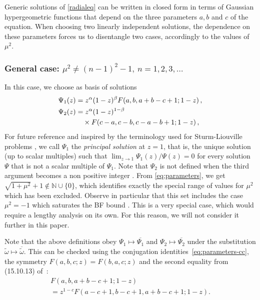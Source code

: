 \documentclass[aps, prd, amsmath, floats, floatfix, twocolumn, nofootinbib, superscriptaddress, showpacs]{revtex4-1}
\def\tomega{{\tilde{\omega}}}
\begin{document}
	Generic solutions of \eqref{radialeq} can be written in closed form in terms of Gaussian hypergeometric functions that depend on the three parameters $a,b$ and $c$ of the equation. When choosing two linearly independent solutions, the dependence on these parameters forces us to disentangle two cases, accordingly to the values of $\mu^2$. 
	
	
	\subsubsection{General case: $\mu^2\neq (n-1)^2-1, \ n=1,2,3,\dots$}	
	
	In this case, we choose as basis of solutions 
	\begin{subequations}\label{eq:z1gen}
	\begin{align}
	\Psi_1(z) & =z^\alpha(1-z)^\beta F(a,b,a+b-c+1;1-z) \label{Psi1a}  \, , \\
	\Psi_2(z) & =z^\alpha(1-z)^{1-\beta}\notag \\
	&\quad \times F(c-a,c-b,c-a-b+1;1-z) \label{Psi2a} \, ,
	\end{align}
	\end{subequations}
	For future reference and inspired by the terminology used for Sturm-Liouville problems \cite{Zettl:2005}, we call $\Psi_1$  the \emph{principal solution} at $z=1$, that is, the unique solution (up to scalar multiples) such that $\lim_{z\to 1} \Psi_1(z)/\Psi(z)=0$ for every solution $\Psi$ that is not a scalar multiple of $\Psi_1$. Note that $\Psi_2$ is not defined when the third argument becomes a non positive integer \cite{NIST}. From \eqref{eq:parameters}, we get $\sqrt{1+\mu^2}+1\not\in\mathbb{N}\cup\{0\}$, which identifies exactly the special range of values for $\mu^2$ which has been excluded. Observe in particular that this set includes the case $\mu^2=-1$ which saturates the BF bound \cite{Breitenlohner:1982jf}. This is a very special case, which would require a lengthy analysis on its own. For this reason, we will not consider it further in this paper.	

	Note that the above definitions obey $\Psi_1 \mapsto
	\overline{\Psi_1}$ and $\Psi_2 \mapsto \overline{\Psi_2}$ under the
	substitution $\tomega \mapsto \overline{\tomega}$. This can be checked
	using the conjugation identities~\eqref{eq:parameters-cc}, the
	symmetry $F(a,b,c;z) = F(b,a,c;z)$ and the second
	equality from (15.10.13) of~\cite{NIST}:
	\begin{multline*}
		F\left(a,b, a+b-c+1;1-z\right) \\
		=z^{1-c}F\left(a-c+1,b-c+1, a+b-c+1;1-z\right) .
	\end{multline*}
	
\end{document}
